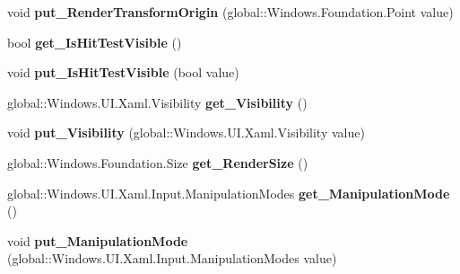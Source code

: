 \begin{DoxyCompactItemize}
void {\bfseries put\+\_\+\+Render\+Transform\+Origin} (global\+::\+Windows.\+Foundation.\+Point value)
\item 
\mbox{\label{interface_windows_1_1_u_i_1_1_xaml_1_1_i_u_i_element_a08d625eccb089821ca78a7845cb5509c}} 
bool {\bfseries get\+\_\+\+Is\+Hit\+Test\+Visible} ()
\item 
\mbox{\label{interface_windows_1_1_u_i_1_1_xaml_1_1_i_u_i_element_aa80fb34be2e9e897b9dc8f558796ab51}} 
void {\bfseries put\+\_\+\+Is\+Hit\+Test\+Visible} (bool value)
\item 
\mbox{\label{interface_windows_1_1_u_i_1_1_xaml_1_1_i_u_i_element_a1d08cd5eebdac6a853903eb22a27b689}} 
global\+::\+Windows.\+U\+I.\+Xaml.\+Visibility {\bfseries get\+\_\+\+Visibility} ()
\item 
\mbox{\label{interface_windows_1_1_u_i_1_1_xaml_1_1_i_u_i_element_aad5d9c40429e519a8d16db9da184a42b}} 
void {\bfseries put\+\_\+\+Visibility} (global\+::\+Windows.\+U\+I.\+Xaml.\+Visibility value)
\item 
\mbox{\label{interface_windows_1_1_u_i_1_1_xaml_1_1_i_u_i_element_a436b4b809e5f92e434326f446a1b3fb0}} 
global\+::\+Windows.\+Foundation.\+Size {\bfseries get\+\_\+\+Render\+Size} ()
\item 
\mbox{\label{interface_windows_1_1_u_i_1_1_xaml_1_1_i_u_i_element_ac7efa9d3bcb66e3a95621d9e942b339d}} 
global\+::\+Windows.\+U\+I.\+Xaml.\+Input.\+Manipulation\+Modes {\bfseries get\+\_\+\+Manipulation\+Mode} ()
\item 
\mbox{\label{interface_windows_1_1_u_i_1_1_xaml_1_1_i_u_i_element_ae026809f65653a37cd75df9589dc5e90}} 
void {\bfseries put\+\_\+\+Manipulation\+Mode} (global\+::\+Windows.\+U\+I.\+Xaml.\+Input.\+Manipulation\+Modes value)
\item 
\mbox{\label{interface_windows_1_1_u_i_1_1_xaml_1_1_i_u_i_element_abae2e6510442e3bf03b0abd24270a3e7}} 

\end{DoxyCompactItemize}

